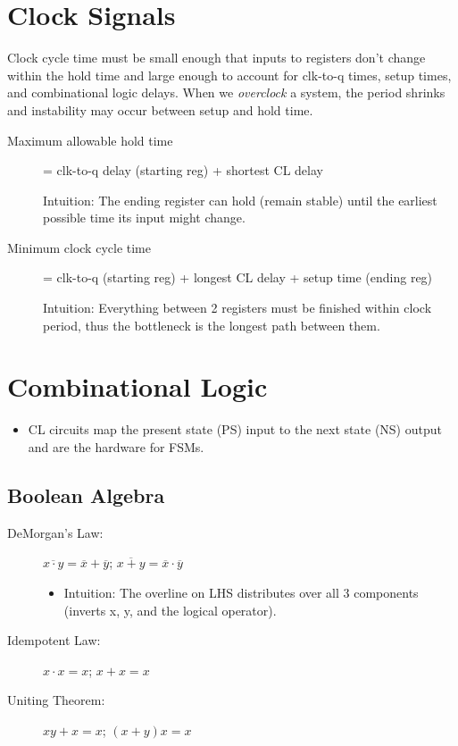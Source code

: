 \section{Clock Signals}
Clock cycle time must be small enough that inputs to registers don't change within the hold time and large enough to account for clk-to-q times, setup times, and combinational logic delays. When we \emph{overclock} a system, the period shrinks and instability may occur between setup and hold time.

\begin{description}
    \item[Maximum allowable hold time] = clk-to-q delay (starting reg) + shortest CL delay
    
    Intuition: The ending register can hold (remain stable) until the earliest possible time its input might change.
    
    \item[Minimum clock cycle time] = clk-to-q (starting reg) + longest CL delay + setup time (ending reg)
    
    Intuition: Everything between 2 registers must be finished within clock period, thus the bottleneck is the longest path between them.
\end{description}


\section{Combinational Logic}
\begin{itemize}
    \item CL circuits map the present state (PS) input to the next state (NS) output and are the hardware for FSMs.
\end{itemize}

\subsection{Boolean Algebra}
\begin{description}
    \item[DeMorgan's Law:] $\overline{x \cdot y} = \overline{x} + \overline{y}$; \quad $\overline{x + y} = \overline{x} \cdot \overline{y}$
    \begin{itemize}
        \item Intuition: The overline on LHS distributes over all 3 components (inverts x, y, and the logical operator).
    \end{itemize}
    
    \item[Idempotent Law:] $x \cdot x = x$; \quad $x + x = x$
    
    \item[Uniting Theorem:] $xy + x = x$; \quad $(x+y)x = x$
\end{description}

